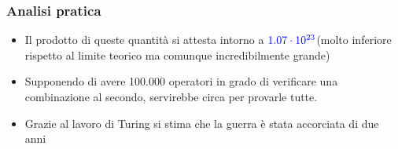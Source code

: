 	\begin{frame}
		\frametitle{Analisi pratica}
		\begin{itemize}
			\item Il prodotto di queste quantità si attesta intorno a $\textcolor{blue}{1.07 \cdot 10^{23}}$(molto inferiore rispetto al limite teorico ma comunque incredibilmente grande)
			\item Supponendo di avere 100.000 operatori in grado di verificare una combinazione al secondo, servirebbe circa  per provarle tutte.
			\item Grazie al lavoro di Turing si stima che la guerra è stata accorciata di due anni
		\end{itemize}
	\end{frame}